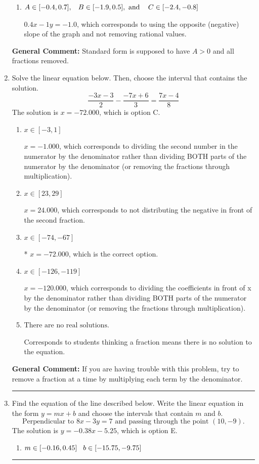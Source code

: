 \documentclass{extbook}[14pt]
\newcommand{\litem}[1]{\item #1

\rule{\textwidth}{0.4pt}}
\begin{document}
\begin{enumerate}
{\begin{enumerate}[label=\Alph*.]
 $0.4x + 1y = 1.0$, which corresponds to not removing rational values for Standard Form.
\item \( A \in [-0.4, 0.7], \hspace{3mm} B \in [-1.9, 0.5], \text{ and } \hspace{3mm} C \in [-2.4, -0.8] \)

 $0.4x - 1y = -1.0$, which corresponds to using the opposite (negative) slope of the graph and not removing rational values.
\end{enumerate}

\textbf{General Comment:} Standard form is supposed to have $A > 0$ and all fractions removed.
}
\litem{
Solve the linear equation below. Then, choose the interval that contains the solution.
\[ \frac{-3x -3}{2} - \frac{-7x + 6}{3} = \frac{7x -4}{8} \]The solution is \( x = -72.000 \), which is option C.\begin{enumerate}[label=\Alph*.]
\item \( x \in [-3, 1] \)

 $x = -1.000$, which corresponds to dividing the second number in the numerator by the denominator rather than dividing BOTH parts of the numerator by the denominator (or removing the fractions through multiplication).
\item \( x \in [23, 29] \)

 $x = 24.000$, which corresponds to not distributing the negative in front of the second fraction.
\item \( x \in [-74, -67] \)

* $x = -72.000$, which is the correct option.
\item \( x \in [-126, -119] \)

 $x = -120.000$, which corresponds to dividing the coefficients in front of x by the denominator rather than dividing BOTH parts of the numerator by the denominator (or removing the fractions through multiplication).
\item \( \text{There are no real solutions.} \)

Corresponds to students thinking a fraction means there is no solution to the equation.
\end{enumerate}

\textbf{General Comment:} If you are having trouble with this problem, try to remove a fraction at a time by multiplying each term by the denominator.
}
\litem{
Find the equation of the line described below. Write the linear equation in the form $ y=mx+b $ and choose the intervals that contain $m$ and $b$.
\[ \text{Perpendicular to } 8 x - 3 y = 7 \text{ and passing through the point } (10, -9). \]The solution is \( y = -0.38x - 5.25 \), which is option E.\begin{enumerate}[label=\Alph*.]
\item \( m \in [-0.16, 0.45] \hspace*{3mm} b \in [-15.75, -9.75] \)


\end{enumerate}}
\end{enumerate}
\end{document}
